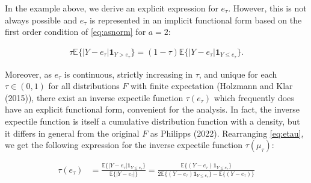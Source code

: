 \documentclass[
]{article}
\theoremstyle{definition}
\theoremstyle{definition}
\theoremstyle{definition}
\theoremstyle{definition}
\theoremstyle{remark}
\begin{document}
In the example above, we derive an explicit expression for \(e_\tau\). However, this is not always possible and \(e_\tau\) is represented in an implicit functional form based on the first order condition of \eqref{eq:asnorm} for \(a=2\):

\begin{align}
\tau\mathbb E\{|Y-e_\tau|\mathbf 1_{Y>e_\tau}\} = (1-\tau)\mathbb E\{|Y-e_\tau|\mathbf 1_{Y\leq e_\tau}\}.\label{eq:etau}
\end{align}

Moreover, as \(e_\tau\) is continuous, strictly increasing in \(\tau\), and unique for each \(\tau\in(0,1)\) for all distributions \(F\) with finite expectation (Holzmann and Klar (2015)), there exist an inverse expectile function \(\tau(e_\tau)\) which frequently does have an explicit functional form, convenient for the analysis. In fact, the inverse expectile function is itself a cumulative distribution function with a density, but it differs in general from the original \(F\) as Philipps (2022). Rearranging \eqref{eq:etau}, we get the following expression for the inverse expectile function \(\tau(\mu_\tau)\):

\begin{align}
\tau(e_\tau) &= \frac{\mathbb E\{|Y-e_\tau|\mathbf 1_{Y\leq e_\tau}\}} {\mathbb E\{|Y-e_\tau|\}} = \frac{\mathbb E\{(Y-e_\tau)\mathbf 1_{Y\leq e_\tau}\}}{2\mathbb E\{(Y-e_\tau)\mathbf 1_{Y\leq e_\tau}\} - \mathbb E\{(Y-e_\tau)\}} \label{eq:tau}
\end{align}
\end{document}
